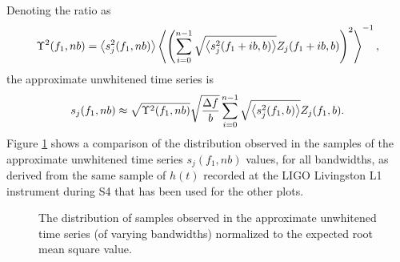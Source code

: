 \documentclass[10pt]{article}
\begin{document}
Denoting the ratio as
\begin{equation}
\Upsilon^{2}(f_{1}, n b)
   = \left\langle s_{j}^{2}(f_{1}, n b)\right\rangle \left\langle\left( \sum_{i = 0}^{n -1}
   \sqrt{\left\langle s_{j}^{2}(f_{1} + i b, b)\right\rangle} Z_{j}(f_{1} + i b, b)
   \right)^{2}\right\rangle^{-1},
\end{equation}
the approximate unwhitened time series is
\begin{equation}
s_{j}(f_{1}, n b)
   \approx \sqrt{\Upsilon^{2}(f_{1}, n b)} \sqrt{\frac{\Delta f}{b}}
   \sum_{i = 0}^{n -1} \sqrt{\left\langle s_{j}^{2}(f_{1}, b)\right\rangle} Z_{j}(f_{1}, b).
\end{equation}
Figure \ref{fig:sjhistogram} shows a comparison of the distribution
observed in the samples of the approximate unwhitened time series
\(s_{j}(f_{1}, n b)\) values, for all bandwidths, as derived from the same
sample of \(h(t)\) recorded at the LIGO Livingston L1 instrument during S4
that has been used for the other plots.
\begin{figure}
\begin{center}
\end{center}
\caption{The distribution of samples observed in the approximate unwhitened
time series (of varying bandwidths) normalized to the expected root mean
square value.}
\label{fig:sjhistogram}
\end{figure}
\end{document}
